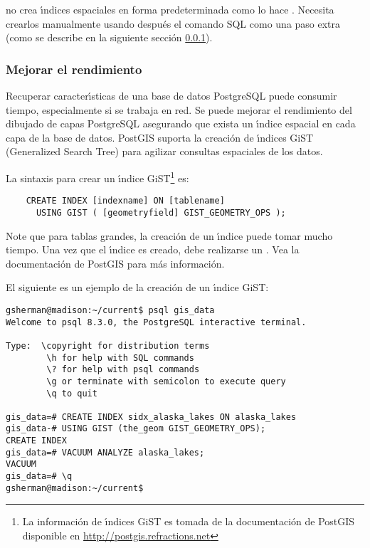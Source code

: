  no crea \'{\i}ndices espaciales en forma predeterminada como lo hace . Necesita crearlos manualmente usando después el comando SQL  como una paso extra (como se describe en la siguiente secci\'on \ref{label_improve}).

\subsubsection{Mejorar el rendimiento} \label{label_improve}

Recuperar caracter\'{\i}sticas de una base de datos PostgreSQL puede consumir tiempo, especialmente si se trabaja en red. Se puede mejorar el rendimiento del dibujado de capas PostgreSQL asegurando que exista un \'{\i}ndice espacial  en cada capa de la base de datos. PostGIS suporta la creaci\'on de \'{\i}ndices GiST (Generalized Search Tree)  para agilizar consultas espaciales de los datos.

La sintaxis para crear un \'{\i}ndice GiST\footnote{La informaci\'on de \'{\i}ndices GiST es tomada de la documentaci\'on de PostGIS
disponible en \url{http://postgis.refractions.net}}
es:

\begin{verbatim}
    CREATE INDEX [indexname] ON [tablename] 
      USING GIST ( [geometryfield] GIST_GEOMETRY_OPS );
\end{verbatim}

Note que para tablas grandes, la creaci\'on de un \'{\i}ndice puede tomar mucho tiempo. Una vez
que el \'{\i}ndice es creado, debe realizarse un . Vea la documentaci\'on de
PostGIS \cite{PostGISweb} para más informaci\'on.

El siguiente es un ejemplo de la creaci\'on de un \'{\i}ndice GiST:
\begin{verbatim}
gsherman@madison:~/current$ psql gis_data
Welcome to psql 8.3.0, the PostgreSQL interactive terminal.

Type:  \copyright for distribution terms
        \h for help with SQL commands
        \? for help with psql commands
        \g or terminate with semicolon to execute query
        \q to quit

gis_data=# CREATE INDEX sidx_alaska_lakes ON alaska_lakes
gis_data-# USING GIST (the_geom GIST_GEOMETRY_OPS);
CREATE INDEX
gis_data=# VACUUM ANALYZE alaska_lakes;
VACUUM
gis_data=# \q
gsherman@madison:~/current$
\end{verbatim}


